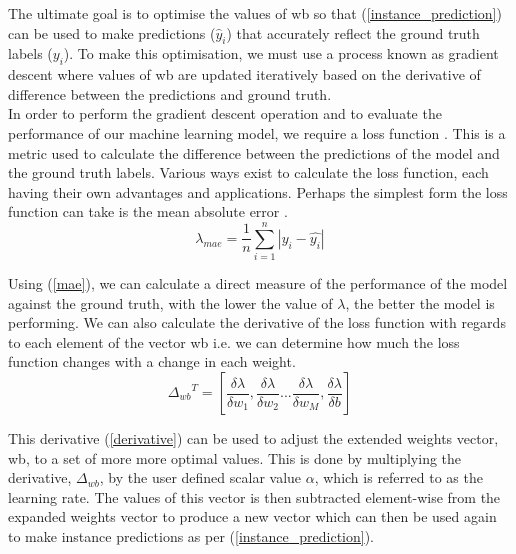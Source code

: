 \noindent
The ultimate goal is to optimise the values of wb so that (\ref{instance_prediction}) can be used to make predictions ($\hat{y}_i$) that accurately reflect the ground truth labels ($y_i$). To make this optimisation, we must use a process known as gradient descent \cite{ruder2016overview} where values of wb are updated iteratively based on the derivative of difference between the predictions and ground truth. \\

\noindent
In order to perform the gradient descent operation and to evaluate the performance of our machine learning model, we require a loss function \cite{wang2022comprehensive}. This is a metric used to calculate the difference between the predictions of the model and the ground truth labels. Various ways exist to calculate the loss function, each having their own advantages and applications. Perhaps the simplest form the loss function can take is the mean absolute error \cite{willmott2005advantages}.\\

\begin{equation} \label{mae}
	\lambda_{mae} = \frac{1}{n}\sum_{i=1}^n | y_i - \hat{y_i} | 
\end{equation}

\noindent
Using (\ref{mae}), we can calculate a direct measure of the performance of the model against the ground truth, with the lower the value of $\lambda$, the better the model is performing.  We can also calculate the derivative of the loss function with regards to each element of the vector wb i.e. we can determine how much the loss function changes with a change in each weight. \\

\begin{equation} \label{derivative}
	{\Delta_{wb}}^T = [\frac{\delta\lambda}{\delta w_1}, \frac{\delta\lambda}{\delta w_2} ... \frac{\delta\lambda}{\delta w_M}, \frac{\delta\lambda}{\delta b}]
\end{equation}

\noindent
This derivative (\ref{derivative}) can be used to adjust the extended weights vector, wb, to a set of more more optimal values. This is done by multiplying the derivative, $\Delta_{wb}$, by the user defined scalar value $\alpha$, which is referred to as the learning rate. The values of this vector is then subtracted element-wise from the expanded weights vector to produce a new vector which can then be used again to make instance predictions as per (\ref{instance_prediction}). \\
 
